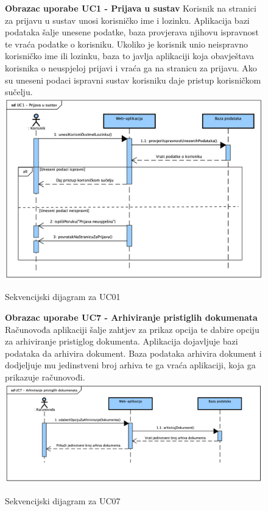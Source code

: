 				\begin{figure}[H]
					\textbf{Obrazac uporabe UC1 - Prijava u sustav}
					Korisnik na stranici za prijavu u sustav unosi korisničko ime i lozinku. Aplikacija bazi podataka šalje unesene podatke, baza provjerava njihovu ispravnost te vraća podatke o korisniku. Ukoliko je korisnik unio neispravno
					korisničko ime ili lozinku, baza to javlja aplikaciji koja obavještava korisnika o neuspjeloj prijavi i vraća ga na stranicu za prijavu. Ako su uneseni podaci ispravni sustav korisniku daje pristup korisničkom sučelju.
					\newline
					\includegraphics[width=\textwidth]{slike/Sequence_UC01.png}
					\caption{Sekvencijski dijagram za UC01}
					\label{fig:sequence_UC01}
				\end{figure}

				\begin{figure}[H]
					\textbf{Obrazac uporabe UC7 - Arhiviranje pristiglih dokumenata}
					Računovođa aplikaciji šalje zahtjev za prikaz opcija te dabire opciju za arhiviranje pristiglog dokumenta. Aplikacija dojavljuje bazi podataka da arhivira dokument.
					Baza podataka arhivira dokument i dodjeljuje mu jedinstveni broj arhiva te ga vraća aplikaciji, koja ga prikazuje računovođi.
					\newline
					\includegraphics[width=\textwidth]{slike/Sequence_UC07.png}
					\caption{Sekvencijski dijagram za UC07}
					\label{fig:sequence_UC07}
				\end{figure}

